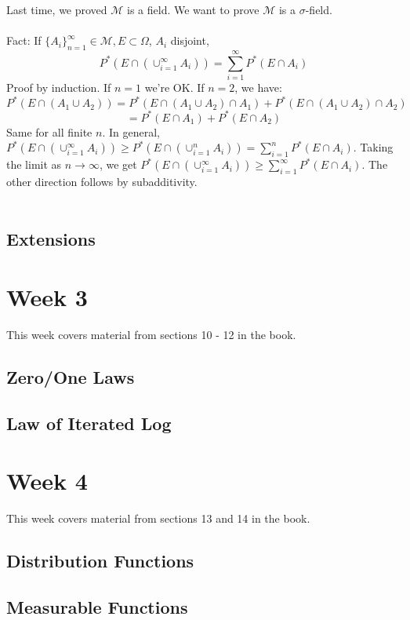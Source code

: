 \documentclass[12pt]{article}
\begin{document}
Last time, we proved $\mathcal{M}$ is a field.  We want to prove $\mathcal{M}$ is a $\sigma$-field.
\\ \\
Fact: If $\{ A_i \}_{n=1}^\infty \in \mathcal{M}, E \subset \Omega$, $A_i$ disjoint,
$$P^*(E \cap (\cup_{i=1}^\infty A_i)) = \sum_{i=1}^\infty P^*(E \cap A_i)$$
Proof by induction.  If $n = 1$ we're OK.  If $n = 2$, we have:
$$P^*(E \cap (A_1 \cup A_2)) = P^*(E \cap (A_1 \cup A_2) \cap A_1) + P^*(E \cap (A_1 \cup A_2) \cap A_2)$$
$$ = P^*(E \cap A_1) + P^*(E \cap A_2)$$
Same for all finite $n$.  In general, $P^*(E \cap (\cup_{i=1}^
\infty A_i)) \ge P^*(E \cap (\cup_{i=1}^n A_i)) = \sum_{i=1}^n P^*(E \cap A_i)$.  Taking the limit as $n \to \infty$, we get $P^*(E \cap (\cup_{i=1}^\infty A_i)) \ge \sum_{i=1}^\infty P^*(E \cap A_i)$.  The other direction follows by subadditivity.
\\ \\

\subsection{Extensions}


\section{Week 3}
This week covers material from sections 10 - 12 in the book.

\subsection{Zero/One Laws}

\subsection{Law of Iterated Log}

\section{Week 4}
This week covers material from sections 13 and 14 in the book.

\subsection{Distribution Functions}

\subsection{Measurable Functions}
\end{document}
